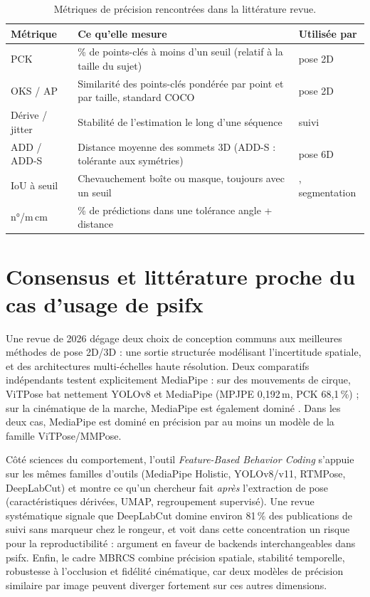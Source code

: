\documentclass[11pt,a4paper]{report}
\begin{document}
\begin{table}[H]
\centering
\caption{Métriques de précision rencontrées dans la littérature revue.}
\label{tab:metriques}
\begin{tabularx}{\textwidth}{@{}lYl@{}}
\toprule
Métrique & Ce qu'elle mesure & Utilisée par \\
\midrule
PCK & \% de points-clés à moins d'un seuil (relatif à la taille du sujet) & pose 2D \cite{chen2014articulated} \\
OKS / AP & Similarité des points-clés pondérée par point et par taille, standard COCO & pose 2D \cite{lin2014coco} \\
Dérive / jitter & Stabilité de l'estimation le long d'une séquence & suivi \cite{vacchetti2004stable} \\
ADD / ADD-S & Distance moyenne des sommets 3D (ADD-S : tolérante aux symétries) & pose 6D \cite{wen2024foundationpose} \\
IoU à seuil & Chevauchement boîte ou masque, toujours avec un seuil & \cite{li2025gcepose}, segmentation \\
n°/m\,cm & \% de prédictions dans une tolérance angle + distance & \cite{li2025gcepose} \\
\bottomrule
\end{tabularx}
\end{table}

\section{Consensus et littérature proche du cas d'usage de psifx}

Une revue de 2026 \cite{shrestha2026survey} dégage deux choix de conception communs aux meilleures méthodes de pose
2D/3D : une sortie structurée modélisant l'incertitude spatiale, et des architectures multi-échelles haute
résolution. Deux comparatifs indépendants testent explicitement MediaPipe : sur des mouvements de cirque, ViTPose
bat nettement YOLOv8 et MediaPipe (MPJPE 0,192\,m, PCK 68,1\,\%) \cite{circus2026mediapipe} ; sur la cinématique de
la marche, MediaPipe est également dominé \cite{gait2022comparison}. Dans les deux cas, MediaPipe est dominé en
précision par au moins un modèle de la famille ViTPose/MMPose.

Côté sciences du comportement, l'outil \emph{Feature-Based Behavior Coding} \cite{fbbc2025} s'appuie sur les mêmes
familles d'outils (MediaPipe Holistic, YOLOv8/v11, RTMPose, DeepLabCut) et montre ce qu'un chercheur fait
\emph{après} l'extraction de pose (caractéristiques dérivées, UMAP, regroupement supervisé). Une revue systématique
\cite{markerless_review} signale que DeepLabCut domine environ 81\,\% des publications de suivi sans marqueur chez le
rongeur, et voit dans cette concentration un risque pour la reproductibilité : argument en faveur de backends
interchangeables dans psifx. Enfin, le cadre MBRCS \cite{fernandez2026mbrcs} combine précision spatiale, stabilité
temporelle, robustesse à l'occlusion et fidélité cinématique, car deux modèles de précision similaire par image
peuvent diverger fortement sur ces autres dimensions.
\end{document}
